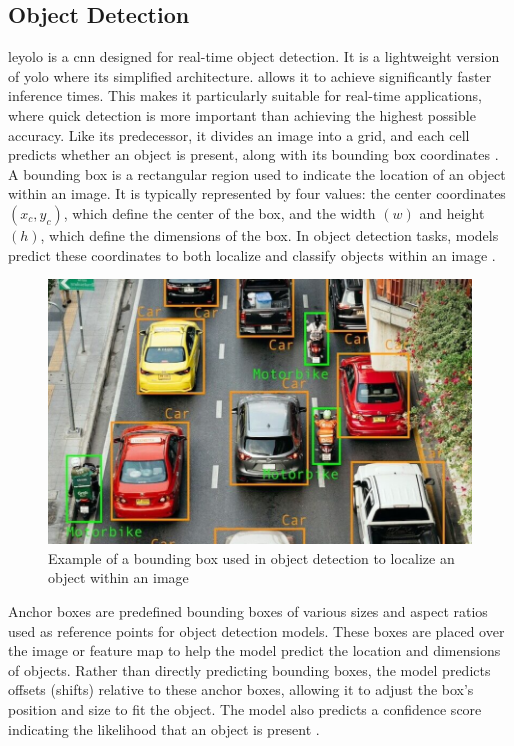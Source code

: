 \subsection{Object Detection}

\gls{leyolo} is a \gls{cnn} designed for real-time object detection. It is a lightweight version of \gls{yolo} where its simplified architecture. allows it to achieve significantly faster inference times. This makes it particularly suitable for real-time applications, where quick detection is more important than achieving the highest possible accuracy. Like its predecessor, it divides an image into a grid, and each cell predicts whether an object is present, along with its bounding box coordinates \cite{openreview:leyolo}.\\

A bounding box is a rectangular region used to indicate the location of an object within an image. It is typically represented by four values: the center coordinates \((x_c, y_c)\), which define the center of the box, and  the width \((w)\) and height \((h)\), which define the dimensions of the box. In object detection tasks, models predict these coordinates to both localize and classify objects within an image \cite{peopleforai:boundingbox}.

\begin{figure}[h!]
    \centering
    \includegraphics[width=0.75\linewidth]{figures/theory/image-recognition/bbox-example.png}
    \caption[Example of a bounding box in object detection]{Example of a bounding box used in object detection to localize an object within an image \cite{peopleforai:boundingbox}}
    \label{fig:boundingbox}
\end{figure}

Anchor boxes are predefined bounding boxes of various sizes and aspect ratios used as reference points for object detection models. These boxes are placed over the image or feature map to help the model predict the location and dimensions of objects. Rather than directly predicting bounding boxes, the model predicts offsets (shifts) relative to these anchor boxes, allowing it to adjust the box's position and size to fit the object. The model also predicts a confidence score indicating the likelihood that an object is present \cite{thinkautonomous:anchorboxes}.

